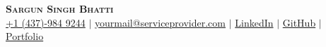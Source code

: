 

\begin{center}
    \textbf{\Huge \scshape Sargun Singh Bhatti} \\ \vspace{3pt}
        \small
    \faMobile \hspace{.5pt} \href{tel:0000000000}{+1 (437)-984 9244}
        $|$
    \faAt \hspace{.5pt} \href{mailto:yourmail@serviceprovider.com}{yourmail@serviceprovider.com}
        $|$
    \faLinkedinSquare \hspace{.5pt} \href{https://www.google.com}{LinkedIn}
        $|$
    \faGithub \hspace{.5pt} \href{https://www.google.com}{GitHub}
        $|$
        \faGlobe \hspace{.5pt} \href{https://www.google.com}{Portfolio}
\end{center}
